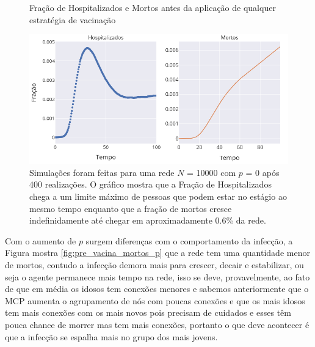 \begin{figure}[H]
    \centering
    \captionsetup{font=normalsize,skip=0.8pt,singlelinecheck=on,labelsep=endash}
    \caption{Fração de Hospitalizados e Mortos antes da aplicação de qualquer estratégia de vacinação}
    \includegraphics[scale= 0.5]{figuras/pre_vacina_mortos_nponderado.png}
    \captionsetup{font=small,justification=justified}
    \caption*{Simulações foram feitas para uma rede $N$ = 10000 com $p $ = 0 após 400 realizações. O gráfico mostra que a Fração de Hospitalizados chega a um limite máximo de pessoas que podem estar no estágio ao mesmo tempo enquanto que a fração de mortos cresce indefinidamente até chegar em aproximadamente 0.6\% da rede.}
    \label{fig:pre_vacina_mortos}
\end{figure}

Com o aumento de $p$ surgem diferenças com o comportamento da infecção, a Figura mostra \ref{fig:pre_vacina_mortos_p} que a rede tem uma quantidade menor de mortos, contudo a infecção demora mais para crescer, decair e estabilizar, ou seja o agente permanece mais tempo na rede, isso se deve, provavelmente, ao fato de que em média os idosos tem conexões menores e sabemos anteriormente que o MCP aumenta o agrupamento de nós com poucas conexões e que os mais idosos tem mais conexões com os mais novos pois precisam de cuidados e esses têm pouca chance de morrer mas tem mais conexões, portanto o que deve acontecer é que a infecção se espalha mais no grupo dos mais jovens.


